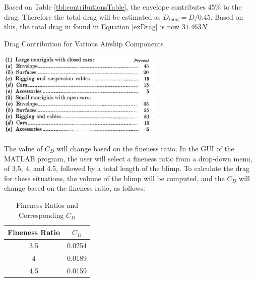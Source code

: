 \documentclass[../main.tex]{subfiles}
\begin{document}
Based on Table \ref{tbl:contributionsTable}, the envelope contributes 45\% to the drag. Therefore the total drag will be estimated as $D_{total}=D/0.45$. Based on this, the total drag in found in Equation \ref{exDrag} is now $31.463N$

\begin{table}[H]
	\centering
	\caption{Drag Contribution for Various Airship Components \cite{airshipAerodynamics}}
	\includegraphics[width=.5\linewidth]{img/drag/contributions.PNG}
	\label{tbl:contributionsTable}
\end{table}

The value of $C_D$ will change based on the fineness ratio. In the GUI of the MATLAB program, the user will select a fineness ratio from a drop-down menu, of 3.5, 4, and 4.5, followed by a total length of the blimp. To calculate the drag for these situations, the volume of the blimp will be computed, and the $C_D$ will change based on the fineness ratio, as follows:
\begin{table}[H]
	\caption{Fineness Ratios and Corresponding $C_D$}
	\label{tbl:finenessCoefficient}
\begin{center}
	\begin{tabular}{|c|c|}
	\hline 
	\textbf{Fineness Ratio} & \textbf{$C_D$} \\ 
	\hline 
	3.5 & 0.0254 \\ 
	\hline 
	4 & 0.0189 \\ 
	\hline 
	4.5 & 0.0159 \\ 
	\hline 
\end{tabular} 
\end{center}
\end{table}
\end{document}
